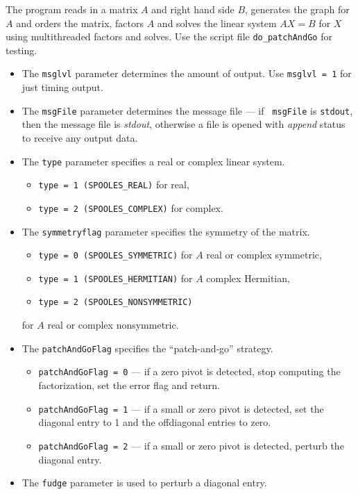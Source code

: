 \begin{enumerate}
\par
The program reads in a matrix $A$ and right hand side $B$,
generates the graph for $A$ and orders the matrix,
factors $A$ and solves the linear system $AX = B$ for $X$
using multithreaded factors and solves.
Use the script file {\tt do\_patchAndGo} for testing.
\par
\begin{itemize}
\item
The {\tt msglvl} parameter determines the amount of output.
Use {\tt msglvl = 1} for just timing output.
\item
The {\tt msgFile} parameter determines the message file --- if {\tt
msgFile} is {\tt stdout}, then the message file is {\it stdout},
otherwise a file is opened with {\it append} status to receive any
output data.
\item
The {\tt type} parameter specifies a real or complex linear system.
\begin{itemize}
\item
{\tt type = 1 (SPOOLES\_REAL)} for real,
\item
{\tt type = 2 (SPOOLES\_COMPLEX)} for complex.
\end{itemize}
\item
The {\tt symmetryflag} parameter specifies the symmetry of the matrix.
\begin{itemize}
\item
{\tt type = 0 (SPOOLES\_SYMMETRIC)} for $A$ real or complex symmetric,
\item
{\tt type = 1 (SPOOLES\_HERMITIAN)} for $A$ complex Hermitian,
\item
{\tt type = 2 (SPOOLES\_NONSYMMETRIC)}
\end{itemize}
for $A$ real or complex nonsymmetric.
\item
The {\tt patchAndGoFlag} specifies the ``patch-and-go'' strategy.
\begin{itemize}
\item
{\tt patchAndGoFlag = 0} --- if a zero pivot is detected, stop
computing the factorization, set the error flag and return.
\item
{\tt patchAndGoFlag = 1} --- if a small or zero pivot is detected, 
set the diagonal entry to 1 and the offdiagonal entries to zero.
\item
{\tt patchAndGoFlag = 2} --- if a small or zero pivot is detected, 
perturb the diagonal entry.
\end{itemize}
\item
The {\tt fudge} parameter is used to perturb a diagonal entry.

\end{itemize}
\end{enumerate}
